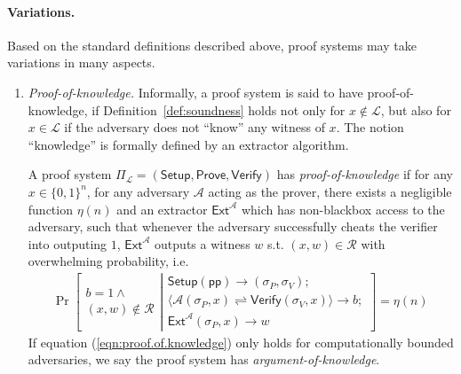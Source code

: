 \documentclass[acmtog]{acmart}
\newcommand{\cA}{\mathcal{A}}
\newcommand{\cL}{\mathcal{L}}
\newcommand{\cR}{\mathcal{R}}
\newcommand{\Setup}{\mathsf{Setup}}
\newcommand{\Prove}{\mathsf{Prove}}
\newcommand{\Verify}{\mathsf{Verify}}
\newcommand{\pp}{\mathsf{pp}}
\newcommand{\PiL}{\Pi_{\cL}}
\newcommand{\Ext}{\mathsf{Ext}}
\begin{document}
\paragraph{Variations.}
Based on the standard definitions described above, proof systems may take variations in many aspects.
\begin{enumerate}
	\item \emph{Proof-of-knowledge.} Informally, a proof system is said to have proof-of-knowledge, if Definition~\ref{def:soundness} holds not only for $x\notin\cL$, but also for $x\in\cL$ if the adversary does not ``know'' any witness of $x$.
	The notion ``knowledge'' is formally defined by an extractor algorithm.
	\begin{definition}
	\label{def:proof.of.knowledge}
	A proof system $\PiL=(\Setup,\Prove,\Verify)$ has \emph{proof-of-knowledge} if for any $x\in\{0,1\}^n$, for any adversary $\cA$ acting as the prover, there exists a negligible function $\eta(n)$ and an extractor $\Ext^{\cA}$ which has non-blackbox access to the adversary, such that whenever the adversary successfully cheats the verifier into outputing $1$, $\Ext^{\cA}$ outputs a witness $w$ s.t. $(x,w)\in\cR$ with overwhelming probability, i.e.
	\begin{eqnarray}
	\label{eqn:proof.of.knowledge}
	\Pr\left[
		\begin{matrix}
		b=1\wedge \\
		(x,w)\notin\cR
		\end{matrix}
	\left|
		\begin{matrix}
		\Setup(\pp)\to(\sigma_P,\sigma_V);\\
		\langle\cA(\sigma_P, x)\rightleftharpoons\Verify(\sigma_V, x)\rangle\to b;\\
		\Ext^{\cA}(\sigma_P, x)\to w
		\end{matrix}
	\right.\right]=\eta(n)\,
	\end{eqnarray}
	If equation (\ref{eqn:proof.of.knowledge}) only holds for computationally bounded adversaries, we say the proof system has \emph{argument-of-knowledge}.
	\end{definition}


\end{enumerate}
\end{document}
